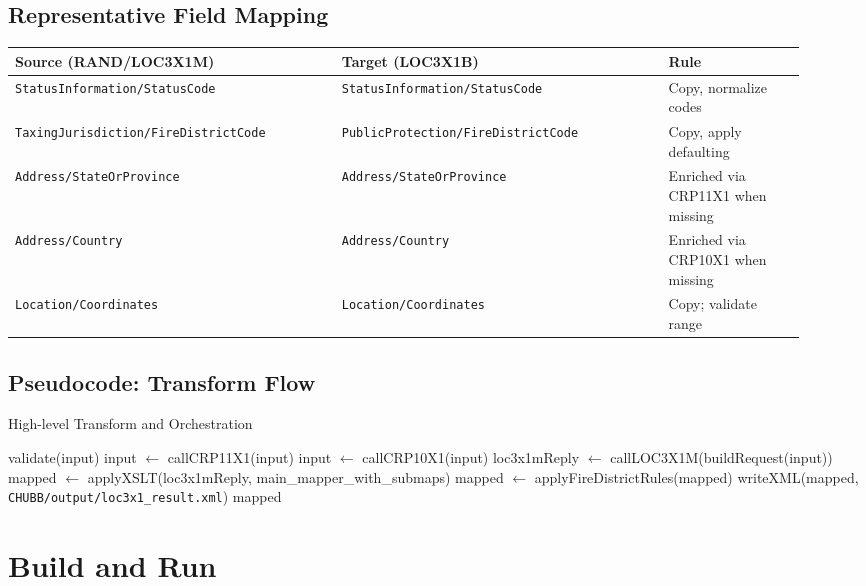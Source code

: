\documentclass[11pt]{article}
\begin{document}
\subsection{Representative Field Mapping}
\begin{center}
\renewcommand{\arraystretch}{1.2}
\begin{tabular}{>{\raggedright}p{0.38\linewidth} >{\raggedright}p{0.38\linewidth} >{\raggedright\arraybackslash}p{0.16\linewidth}}
\toprule
\textbf{Source (RAND/LOC3X1M)} & \textbf{Target (LOC3X1B)} & \textbf{Rule} \\
\midrule
\texttt{StatusInformation/StatusCode} & \texttt{StatusInformation/StatusCode} & Copy, normalize codes \\
\texttt{TaxingJurisdiction/FireDistrictCode} & \texttt{PublicProtection/FireDistrictCode} & Copy, apply defaulting \\
\texttt{Address/StateOrProvince} & \texttt{Address/StateOrProvince} & Enriched via CRP11X1 when missing \\
\texttt{Address/Country} & \texttt{Address/Country} & Enriched via CRP10X1 when missing \\
\texttt{Location/Coordinates} & \texttt{Location/Coordinates} & Copy; validate range \\
\bottomrule
\end{tabular}
\end{center}

\subsection{Pseudocode: Transform Flow}
\begin{algorithm}
\caption{High-level Transform and Orchestration}
\begin{algorithmic}[1]
  \State validate(input)
    \State input $\gets$ callCRP11X1(input)
  \EndIf
    \State input $\gets$ callCRP10X1(input)
  \EndIf
  \State loc3x1mReply $\gets$ callLOC3X1M(buildRequest(input))
  \State mapped $\gets$ applyXSLT(loc3x1mReply, main\_mapper\_with\_submaps)
  \State mapped $\gets$ applyFireDistrictRules(mapped)
  \State writeXML(mapped, \texttt{CHUBB/output/loc3x1\_result.xml})
  \State \Return mapped
\EndFunction
\end{algorithmic}
\end{algorithm}


\section{Build and Run}
\end{document}
